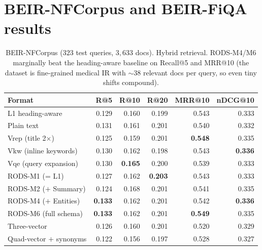 \documentclass[11pt]{article}
\begin{document}
\appendix

\section{BEIR-NFCorpus and BEIR-FiQA results}
\label{app:beir}

\begin{table}[H]
\centering
\caption{BEIR-NFCorpus ($323$ test queries, $3{,}633$ docs). Hybrid retrieval.
  RODS-M4/M6 marginally beat the heading-aware baseline on Recall@5 and
  MRR@10 (the dataset is fine-grained medical IR with $\sim 38$ relevant
  docs per query, so even tiny shifts compound).}
\label{tab:nfcorpus}
\begin{tabular}{lrrrrr}
\toprule
\textbf{Format} & \textbf{R@5} & \textbf{R@10} & \textbf{R@20} & \textbf{MRR@10} & \textbf{nDCG@10} \\
\midrule
L1 heading-aware             & 0.129 & 0.160 & 0.199 & 0.543 & 0.333 \\
Plain text                       & 0.131 & 0.161 & 0.201 & 0.540 & 0.332 \\
\midrule
Vrep (title 2$\times$)       & 0.125 & 0.159 & 0.201 & \textbf{0.548} & 0.335 \\
Vkw (inline keywords)        & 0.130 & 0.162 & 0.198 & 0.543 & \textbf{0.336} \\
Vqe (query expansion)        & 0.130 & \textbf{0.165} & 0.200 & 0.539 & 0.333 \\
\midrule
RODS-M1 (= L1)               & 0.127 & 0.162 & \textbf{0.203} & 0.543 & 0.333 \\
RODS-M2 ($+$ Summary)        & 0.124 & 0.168 & 0.201 & 0.541 & 0.335 \\
RODS-M4 ($+$ Entities)       & \textbf{0.133} & 0.162 & 0.201 & 0.542 & \textbf{0.336} \\
\rowcolor{bestcolor!12}
RODS-M6 (full schema)        & \textbf{0.133} & 0.162 & 0.201 & \textbf{0.549} & 0.335 \\
\midrule
Three-vector                 & 0.126 & 0.160 & 0.201 & 0.520 & 0.329 \\
Quad-vector $+$ synonyms     & 0.122 & 0.156 & 0.197 & 0.528 & 0.327 \\
\bottomrule
\end{tabular}
\end{table}
\end{document}
